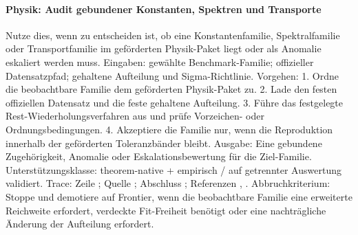 \paragraph{Physik: Audit gebundener Konstanten, Spektren und Transporte}
Nutze dies, wenn zu entscheiden ist, ob eine Konstantenfamilie, Spektralfamilie oder Transportfamilie im geförderten Physik-Paket liegt oder als Anomalie eskaliert werden muss.
Eingaben: gewählte Benchmark-Familie; \allowbreak offizieller Datensatzpfad; \allowbreak gehaltene Aufteilung und Sigma-Richtlinie.
Vorgehen: 1. Ordne die beobachtbare Familie dem geförderten Physik-Paket zu. 2. Lade den festen offiziellen Datensatz und die feste gehaltene Aufteilung. 3. Führe das festgelegte Rest-Wiederholungsverfahren aus und prüfe Vorzeichen- oder Ordnungsbedingungen. 4. Akzeptiere die Familie nur, wenn die Reproduktion innerhalb der geförderten Toleranzbänder bleibt.
Ausgabe: Eine gebundene Zugehörigkeit, Anomalie oder Eskalationsbewertung für die Ziel-Familie.
Unterstützungsklasse: theorem-native + empirisch / auf getrennter Auswertung validiert.
Trace: Zeile ; \allowbreak Quelle ; \allowbreak Abschluss ; \allowbreak Referenzen , \allowbreak {}.
Abbruchkriterium: Stoppe und demotiere auf Frontier, wenn die beobachtbare Familie eine erweiterte Reichweite erfordert, verdeckte Fit-Freiheit benötigt oder eine nachträgliche Änderung der Aufteilung erfordert.


